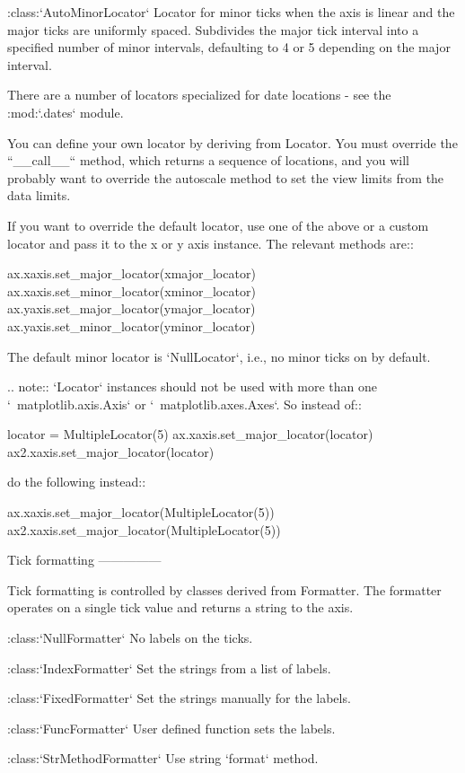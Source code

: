 \begin{DoxyVerb}
:class:`AutoMinorLocator`
    Locator for minor ticks when the axis is linear and the
    major ticks are uniformly spaced.  Subdivides the major
    tick interval into a specified number of minor intervals,
    defaulting to 4 or 5 depending on the major interval.


There are a number of locators specialized for date locations - see
the :mod:`.dates` module.

You can define your own locator by deriving from Locator. You must
override the ``__call__`` method, which returns a sequence of locations,
and you will probably want to override the autoscale method to set the
view limits from the data limits.

If you want to override the default locator, use one of the above or a custom
locator and pass it to the x or y axis instance. The relevant methods are::

  ax.xaxis.set_major_locator(xmajor_locator)
  ax.xaxis.set_minor_locator(xminor_locator)
  ax.yaxis.set_major_locator(ymajor_locator)
  ax.yaxis.set_minor_locator(yminor_locator)

The default minor locator is `NullLocator`, i.e., no minor ticks on by default.

.. note::
    `Locator` instances should not be used with more than one
    `~matplotlib.axis.Axis` or `~matplotlib.axes.Axes`. So instead of::

        locator = MultipleLocator(5)
        ax.xaxis.set_major_locator(locator)
        ax2.xaxis.set_major_locator(locator)

    do the following instead::

        ax.xaxis.set_major_locator(MultipleLocator(5))
        ax2.xaxis.set_major_locator(MultipleLocator(5))

Tick formatting
---------------

Tick formatting is controlled by classes derived from Formatter. The formatter
operates on a single tick value and returns a string to the axis.

:class:`NullFormatter`
    No labels on the ticks.

:class:`IndexFormatter`
    Set the strings from a list of labels.

:class:`FixedFormatter`
    Set the strings manually for the labels.

:class:`FuncFormatter`
    User defined function sets the labels.

:class:`StrMethodFormatter`
    Use string `format` method.


\end{DoxyVerb}
